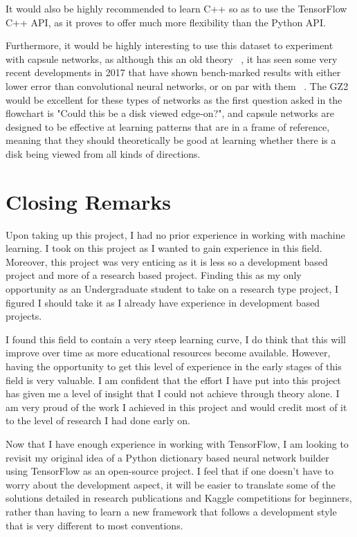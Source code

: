 \documentclass[12pt,a4paper,oneside,oldfontcommands]{memoir}
\begin{document}
\begin{Declaration Of OriginalityOrginality}
It would also be highly recommended to learn C++ so as to use the TensorFlow C++ API, as it proves to offer much more flexibility than the Python API.

Furthermore, it would be highly interesting to use this dataset to experiment with capsule networks, as although this an old theory ~\cite{cap1}, it has seen some very recent developments in 2017 that have shown bench-marked results with either lower error than convolutional neural networks, or on par with them ~\cite{cap2}. The GZ2 would be excellent for these types of networks as the first question asked in the flowchart is "Could this be a disk viewed edge-on?", and capsule networks are designed to be effective at learning patterns that are in a frame of reference, meaning that they should theoretically be good at learning whether there is a disk being viewed from all kinds of directions. 
\chapter{Closing Remarks}

Upon taking up this project, I had no prior experience in working with machine learning. I took on this project as I wanted to gain experience in this field. Moreover, this project was very enticing as it is less so a development based project and more of a research based project. Finding this as my only opportunity as an Undergraduate student to take on a research type project, I figured I should take it as I already have experience in development based projects.

I found this field to contain a very steep learning curve, I do think that this will improve over time as more educational resources become available. However, having the opportunity to get this level of experience in the early stages of this field is very valuable. I am confident that the effort I have put into this project has given me a level of insight that I could not achieve through theory alone. I am very proud of the work I achieved in this project and would credit most of it to the level of research I had done early on.

Now that I have enough experience in working with TensorFlow, I am looking to revisit my original idea of a Python dictionary based neural network builder using TensorFlow as an open-source project. I feel that if one doesn't have to worry about the development aspect, it will be easier to translate some of the solutions detailed in research publications and Kaggle competitions for beginners, rather than having to learn a new framework that follows a development style that is very different to most conventions. 


\end{Declaration Of OriginalityOrginality}
\end{document}
